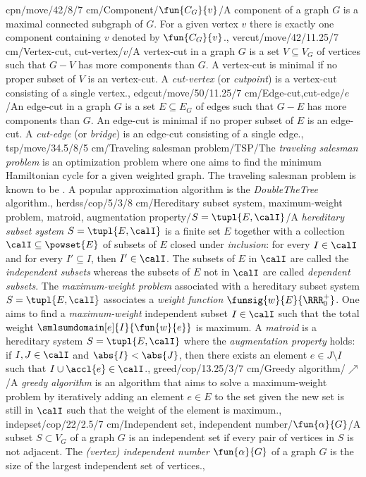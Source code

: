 cpn/move/42/8/7 cm/{Component}/{$\fun{C_G}{v}$}/{A component of a graph $G$ is a maximal connected subgraph of $G$. For a given vertex $v$ there is exactly one component containing $v$ denoted by $\fun{C_G}{v}$.},
vercut/move/42/11.25/7 cm/{Vertex-cut, cut-vertex}/{\Rightscissors$v$}/{A vertex-cut in a graph $G$ is a set $V\subseteq V_G$ of vertices such that $G-V$ has more components than $G$. A vertex-cut is minimal if no proper subset of $V$ is an vertex-cut. A \emph{cut-vertex} (or \emph{cutpoint}) is a vertex-cut consisting of a single vertex.},
edgcut/move/50/11.25/7 cm/{Edge-cut,cut-edge}/{\Rightscissors$e$}/{An edge-cut in a graph $G$ is a set $E\subseteq E_G$ of edges such that $G-E$ has more components than $G$. An edge-cut is minimal if no proper subset of $E$ is an edge-cut. A \emph{cut-edge} (or \emph{bridge}) is an edge-cut consisting of a single edge.},
tsp/move/34.5/8/5 cm/{Traveling salesman problem}/{TSP}/{The \emph{traveling salesman problem} is an optimization problem where one aims to find the minimum Hamiltonian cycle for a given weighted graph. The traveling salesman problem is known to be \ccnph{}. A popular approximation algorithm is the \emph{DoubleTheTree} algorithm.},
herdss/cop/5/3/8 cm/{Hereditary subset system, maximum-weight problem, matroid, augmentation property}/{$S=\tupl{E,\calI}$}/{A \emph{hereditary subset system} $S=\tupl{E,\calI}$ is a finite set $E$ together with a collection $\calI\subseteq\powset{E}$ of subsets of $E$ closed under \emph{inclusion}: for every $I\in\calI$ and for every $I'\subseteq I$, then $I'\in\calI$. The subsets of $E$ in $\calI$ are called the \emph{independent subsets} whereas the subsets of $E$ not in $\calI$ are called \emph{dependent subsets}. The \emph{maximum-weight problem} associated with a hereditary subset system $S=\tupl{E,\calI}$ associates a \emph{weight function} $\funsig{w}{E}{\RRR^+_0}$. One aims to find a \emph{maximum-weight} independent subset $I\in\calI$ such that the total weight $\smlsumdomain[e]{I}{\fun{w}{e}}$ is maximum. A \emph{matroid} is a hereditary system $S=\tupl{E,\calI}$ where the \emph{augmentation property} holds: if $I,J\in\calI$ and $\abs{I}<\abs{J}$, then there exists an element $e\in J\setminus I$ such that $I\cup\accl{e}\in\calI$.},
greed/cop/13.25/3/7 cm/{Greedy algorithm}/{\textdollaroldstyle$\nearrow$}/{A \emph{greedy algorithm} is an algorithm that aims to solve a maximum-weight problem by iteratively adding an element $e\in E$ to the set given the new set is still in $\calI$ such that the weight of the element is maximum.},%
indepset/cop/22/2.5/7 cm/{Independent set, independent number}/{$\fun{\alpha}{G}$}/{A subset $S\subset V_G$ of a graph $G$ is an independent set if every pair of vertices in $S$ is not adjacent. The \emph{(vertex) independent number} $\fun{\alpha}{G}$ of a graph $G$ is the size of the largest independent set of vertices.},
